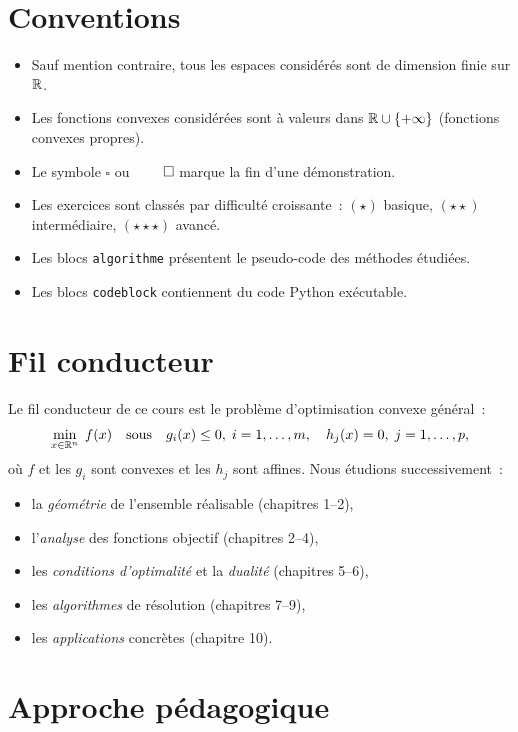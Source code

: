 \section*{Conventions}

\begin{itemize}
    \item Sauf mention contraire, tous les espaces consid\'er\'es sont de dimension finie
          sur $\mathbb{R}$.
    \item Les fonctions convexes consid\'er\'ees sont \`a valeurs dans
          $\mathbb{R} \cup \{+\infty\}$ (fonctions convexes propres).
    \item Le symbole $\square$ ou $\qed$ marque la fin d'une d\'emonstration.
    \item Les exercices sont class\'es par difficult\'e croissante~:
          $(\star)$ basique, $(\star\star)$ interm\'ediaire, $(\star\star\star)$ avanc\'e.
    \item Les blocs \texttt{algorithme} pr\'esentent le pseudo-code des m\'ethodes \'etudi\'ees.
    \item Les blocs \texttt{codeblock} contiennent du code Python ex\'ecutable.
\end{itemize}

\section*{Fil conducteur}

Le fil conducteur de ce cours est le probl\`eme d'optimisation convexe g\'en\'eral~:
\[
    \min_{x \in \mathbb{R}^n} \; f(x) \quad \text{sous} \quad
    g_i(x) \leq 0, \; i=1,\ldots,m, \quad
    h_j(x) = 0, \; j=1,\ldots,p,
\]
o\`u $f$ et les $g_i$ sont convexes et les $h_j$ sont affines. Nous \'etudions
successivement~:
\begin{itemize}
    \item la \emph{g\'eom\'etrie} de l'ensemble r\'ealisable (chapitres 1--2),
    \item l'\emph{analyse} des fonctions objectif (chapitres 2--4),
    \item les \emph{conditions d'optimalit\'e} et la \emph{dualit\'e} (chapitres 5--6),
    \item les \emph{algorithmes} de r\'esolution (chapitres 7--9),
    \item les \emph{applications} concr\`etes (chapitre 10).
\end{itemize}

\section*{Approche p\'edagogique}

